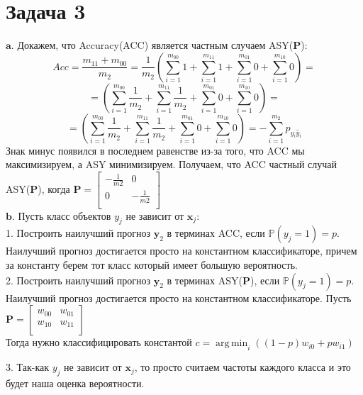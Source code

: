 \documentclass[12pt, twoside]{article}
\DeclareMathOperator*{\argmin}{arg\,min}
\begin{document}
\section{Задача 3}
$\textbf{a.}$ Докажем, что Accuracy(ACC) является частным случаем ASY(\textbf{P}):\\

$$Acc = \frac{m_{11}+m_{00}}{m_2} = \frac{1}{m_2}\left(\sum_{i=1}^{m_{00}}1  + \sum_{i=1}^{m_{11}}1 + \sum_{i=1}^{m_{01}}0  + \sum_{i=1}^{m_{10}}0\right) =$$
$$= \left(\sum_{i=1}^{m_{00}}\frac{1}{m_2}  + \sum_{i=1}^{m_{11}}\frac{1}{m_2} + \sum_{i=1}^{m_{01}}0  + \sum_{i=1}^{m_{10}}0\right) = $$
$$= \left(\sum_{i=1}^{m_{00}}\frac{1}{m_2}  + \sum_{i=1}^{m_{11}}\frac{1}{m_2} + \sum_{i=1}^{m_{01}}0  + \sum_{i=1}^{m_{10}}0\right) = -\sum_{i=1}^{m_2}p_{y_i\hat{y}_i}$$
Знак минус появился в последнем равенстве из-за того, что ACC  мы максимизируем, а ASY минимизируем. Получаем, что ACC частный случай  ASY($\mathbf{P}$), когда 
$\mathbf{P}=
\begin{bmatrix} 
-\frac{1}{m2} &0\\
0&-\frac{1}{m2}\\
\end{bmatrix}$\\
$\textbf{b.}$ Пусть класс объектов $y_j$ не зависит от $\textbf{x}_j$:\\

1. Построить наилучший прогноз $\hat{\textbf{y}}_2$ в терминах ACC, если $\mathbb{P}(y_j = 1) = p$.\\
Наилучший прогноз достигается просто на константном классификаторе, причем за константу берем тот класс который имеет большую вероятность.\\

2. Построить наилучший прогноз $\hat{\textbf{y}}_2$ в терминах ASY(\textbf{P}), если $\mathbb{P}(y_j = 1) = p$.\\
Наилучший прогноз достигается просто на константном классификаторе. Пусть 
$\mathbf{P}=\begin{bmatrix} 
w_{00} & w_{01}\\
w_{10} & w_{11}\\
\end{bmatrix}$\\
Тогда нужно классифицировать константой $c = \argmin_{i}\left((1-p)w_{i0} + pw_{i1}\right)$ 

3. Так-как $y_j$ не зависит от $\textbf{x}_j$, то просто считаем частоты каждого класса и это будет наша оценка вероятности.
\end{document}
